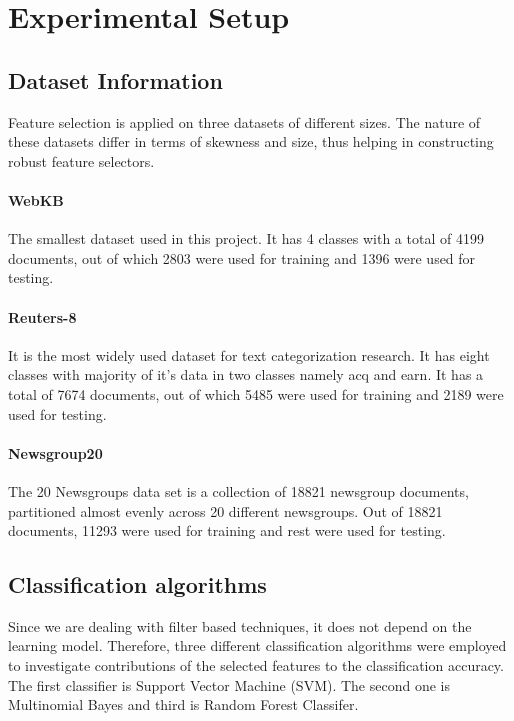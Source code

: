 \documentclass[a4paper, 14pt]{article}
\begin{document}
\section{Experimental Setup}
\begin{justify}

\subsection{Dataset Information}
\begin{justify}
Feature selection is applied on three datasets of different sizes. The nature of these datasets differ in terms of skewness and size, thus helping in constructing robust feature selectors.

\paragraph{WebKB \cite{webkb}}
The smallest dataset used in this project. It has 4 classes with a total of 4199 documents, out of which 2803 were used for training and 1396 were used for testing.


\paragraph{Reuters-8 \cite{r8}}
It is the most widely used dataset for text categorization research. It has eight classes with majority of it's data in two classes namely acq and earn. It has a total of 7674 documents, out of which 5485 were used for training and 2189 were used for testing. 



\paragraph{Newsgroup20 \cite{ng20}}
The 20 Newsgroups data set is a collection of 18821 newsgroup documents, partitioned almost evenly across 20 different newsgroups. Out of 18821 documents, 11293 were used for training and rest were used for testing. 



\end{justify}

\subsection{Classification algorithms}
\begin{justify}

Since we are dealing with filter based techniques, it does not depend on the learning model. Therefore, three different classification algorithms were employed to investigate contributions of the selected features to the classification accuracy. The first classifier is Support Vector Machine (SVM). The second one is Multinomial Bayes and third is Random Forest Classifer.


\end{justify}
\end{justify}
\end{document}
